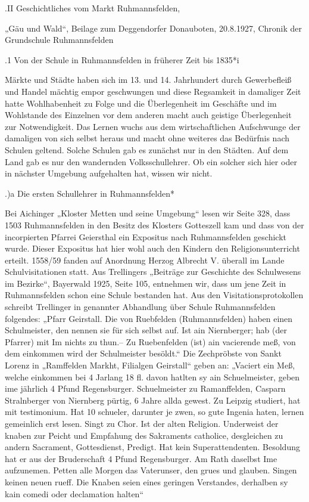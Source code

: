 \documentclass[12pt,a4paper]{book}
\begin{document}
.II Geschichtliches vom Markt Ruhmannsfelden,

„Gäu und Wald“, Beilage zum Deggendorfer Donauboten, 20.8.1927, Chronik der
Grundschule Ruhmannsfelden

.1 Von der Schule in Ruhmannsfelden in früherer Zeit bis 1835*i

Märkte und Städte haben sich im 13. und 14. Jahrhundert durch Gewerbefleiß und
Handel mächtig empor geschwungen und diese Regsamkeit in damaliger Zeit hatte
Wohlhabenheit zu Folge und die Überlegenheit im Geschäfte und im Wohlstande des
Einzelnen vor dem anderen macht auch geistige Überlegenheit zur Notwendigkeit.
Das Lernen wuchs aus dem wirtschaftlichen Aufschwunge der damaligen von sich
selbst heraus und macht ohne weiteres das Bedürfnis nach Schulen geltend. Solche
Schulen gab es zunächst nur in den Städten. Auf dem Land gab es nur den
wandernden Volksschullehrer. Ob ein solcher sich hier oder in nächster Umgebung
aufgehalten hat, wissen wir nicht.

.)a Die ersten Schullehrer in Ruhmannsfelden*

Bei Aichinger „Kloster Metten und seine Umgebung“ lesen wir Seite 328, dass 1503
Ruhmannsfelden in den Besitz des Klosters Gotteszell kam und dass von der
incorpierten Pfarrei Geiersthal ein Expositus nach Ruhmannsfelden geschickt
wurde. Dieser Expositus hat hier wohl auch den Kindern den Religionsunterricht
erteilt. 1558/59 fanden auf Anordnung Herzog Albrecht V. überall im Lande
Schulvisitationen statt. Aus Trellingers „Beiträge zur Geschichte des
Schulwesens im Bezirke“, Bayerwald 1925, Seite 105, entnehmen wir, dass um jene
Zeit in Ruhmannsfelden schon eine Schule bestanden hat. Aus den
Visitationsprotokollen schreibt Trellinger in genannter Abhandlung über Schule
Ruhmannsfelden folgendes: „Pfarr Geirstall. Die von Ruebfelden (Ruhmannsfelden)
haben einen Schulmeister, den nennen sie für sich selbst auf. Ist ain
Niernberger; hab (der Pfarrer) mit Im nichts zu thun.--  Zu Ruebenfelden (ist)
ain vacierende meß, von dem einkommen wird der Schulmeister besöldt.“ Die
Zechpröbste von Sankt Lorenz in „Ramffelden Markht, Filialgen Geirstall“ geben
an: „Vaciert ein Meß, welche einkommen bei 4 Jarlang 18 fl. davon hatlten sy ain
Schuelmeister, geben ime jährlich 4 Pfund Regensburger. Schuelmeister zu
Ramanffelden, Casparn Stralnberger von Niernberg pürtig, 6 Jahre allda gewest.
Zu Leipzig studiert, hat mit testimonium. Hat 10 schueler, darunter je zwen, so
gute Ingenia haten, lernen gemeinlich erst lesen. Singt zu Chor. Ist der alten
Religion. Underweist der knaben zur Peicht und Empfahung des Sakraments
catholice, desgleichen zu andern Sacrament, Gottesdienst, Predigt. Hat kein
Superattendenten. Besoldung hat er aus der Bruderschaft 4 Pfund Regensburger. Am
Rath daselbst Ime aufzunemen. Petten alle Morgen das Vaterunser, den grues und
glauben. Singen keinen neuen rueff. Die Knaben seien eines geringen Verstandes,
derhalben sy kain comedi oder declamation halten“
\end{document}
